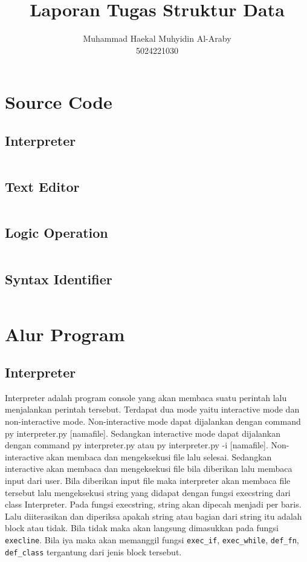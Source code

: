 \documentclass{article}
\title{Laporan Tugas Struktur Data}
\author{Muhammad Haekal Muhyidin Al-Araby \\ 5024221030}
\date{}
\begin{document}
\maketitle

\section{Source Code}
\subsection{Interpreter}
\inputminted{python3}{D:/PyProj/interpreted-lang-py/interpreter.py}
\subsection{Text Editor}
\inputminted{python3}{D:/PyProj/interpreted-lang-py/App.py}
\subsection{Logic Operation}
\inputminted{python3}{D:/PyProj/interpreted-lang-py/LogicOperation.py}
\subsection{Syntax Identifier}
\inputminted{python3}{D:/PyProj/interpreted-lang-py/syntax_identifier.py}
\section{Alur Program}
\subsection{Interpreter}
Interpreter adalah program console yang akan membaca suatu perintah lalu menjalankan perintah tersebut. 
Terdapat dua mode yaitu interactive mode dan non-interactive mode. Non-interactive mode dapat dijalankan 
dengan command py interpreter.py [namafile]. Sedangkan interactive mode dapat dijalankan dengan 
command py interpreter.py atau py interpreter.py -i [namafile]. Non-interactive akan membaca dan mengeksekusi
file lalu selesai. Sedangkan interactive akan membaca dan mengeksekusi file bila diberikan lalu membaca input 
dari user. Bila diberikan input file maka interpreter akan membaca file tersebut lalu mengeksekusi string yang didapat
dengan fungsi execstring dari class Interpreter. Pada fungsi execstring, string akan dipecah menjadi per baris. Lalu
diiterasikan dan diperiksa apakah string atau bagian dari string itu adalah block atau tidak. Bila tidak maka akan 
langsung dimasukkan pada fungsi \texttt{execline}. Bila iya maka akan memanggil fungsi \texttt{exec\_if}, \texttt{exec\_while}, 
\texttt{def\_fn}, \texttt{def\_class} tergantung dari jenis block tersebut. 
\end{document}
